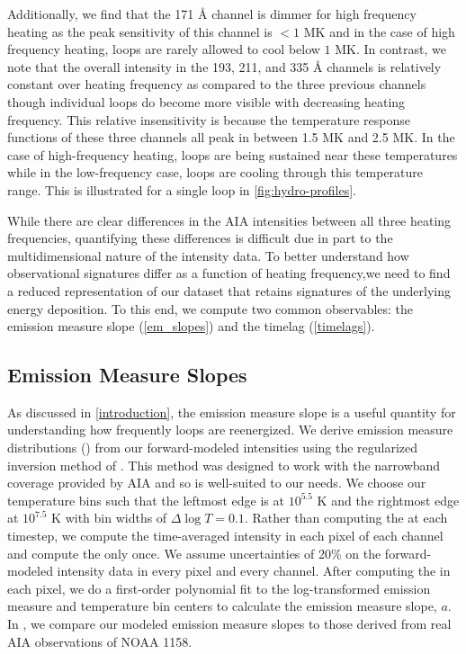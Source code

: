 Additionally, we find that the 171 \AA{} channel is dimmer for high frequency heating as the peak sensitivity of this channel is $<1$ MK and in the case of high frequency heating, loops are rarely allowed to cool below $1$ MK. In contrast, we note that the overall intensity in the 193, 211, and 335 \AA{} channels is relatively constant over heating frequency as compared to the three previous channels though individual loops do become more visible with decreasing heating frequency. This relative insensitivity is because the temperature response functions of these three channels all peak in between 1.5 MK and 2.5 MK. In the case of high-frequency heating, loops are being sustained near these temperatures while in the low-frequency case, loops are cooling through this temperature range. This is illustrated for a single loop in \autoref{fig:hydro-profiles}.

While there are clear differences in the AIA intensities between all three heating frequencies, quantifying these differences is difficult due in part to the multidimensional nature of the intensity data. To better understand how observational signatures differ as a function of heating frequency,we need to find a reduced representation of our dataset that retains signatures of the underlying energy deposition. To this end, we compute two common observables: the emission measure slope (\autoref{em_slopes}) and the timelag (\autoref{timelags}).

\subsection{Emission Measure Slopes}\label{em_slopes}

As discussed in \autoref{introduction}, the emission measure slope is a useful quantity for understanding how frequently loops are reenergized. We derive emission measure distributions (\dem{}) from our forward-modeled intensities using the regularized inversion method of \citet{hannah_differential_2012}. This method was designed to work with the narrowband coverage provided by AIA and so is well-suited to our needs. We choose our temperature bins such that the leftmost edge is at $10^{5.5}$ K and the rightmost edge at $10^{7.5}$ K with bin widths of $\Delta\log T=0.1$. Rather than computing the \dem{} at each timestep, we compute the time-averaged intensity in each pixel of each channel and compute the \dem{} only once. We assume uncertainties of 20\% on the forward-modeled intensity data in every pixel and every channel. After computing the \dem{} in each pixel, we do a first-order polynomial fit to the log-transformed emission measure and temperature bin centers to calculate the emission measure slope, $a$. In , we compare our modeled emission measure slopes to those derived from real AIA observations of NOAA 1158.

